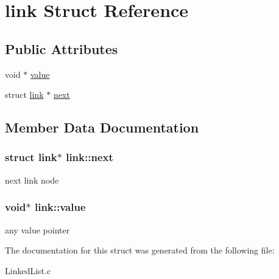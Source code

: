 \hypertarget{structlink}{}\section{link Struct Reference}
\label{structlink}
\subsection*{Public Attributes}
\begin{DoxyCompactItemize}
\item 
void $\ast$ \hyperlink{structlink_ac24c9e855123956183110a098efe2dac}{value}
\item 
struct \hyperlink{structlink}{link} $\ast$ \hyperlink{structlink_a7d3b312c211d4e29a3a7df6c5219b923}{next}
\end{DoxyCompactItemize}


\subsection{Member Data Documentation}
\hypertarget{structlink_a7d3b312c211d4e29a3a7df6c5219b923}{}
\subsubsection[{next}]{\setlength{\rightskip}{0pt plus 5cm}struct {\bf link}$\ast$ link\+::next}\label{structlink_a7d3b312c211d4e29a3a7df6c5219b923}
next link node \hypertarget{structlink_ac24c9e855123956183110a098efe2dac}{}
\subsubsection[{value}]{\setlength{\rightskip}{0pt plus 5cm}void$\ast$ link\+::value}\label{structlink_ac24c9e855123956183110a098efe2dac}
any value pointer 

The documentation for this struct was generated from the following file\+:\begin{DoxyCompactItemize}
\item 
Linked\+List.\+c\end{DoxyCompactItemize}
